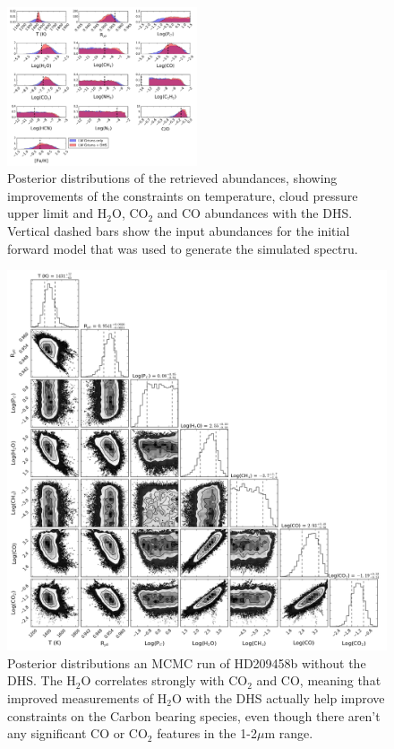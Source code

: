 \documentclass[iop]{emulateapj}
\begin{document}
\begin{figure}
\centering
\includegraphics[width=0.5\textwidth]{HD209458b_solar_clear_DHS.pdf}
\caption{Posterior distributions of the retrieved abundances, showing improvements of the constraints on temperature, cloud pressure upper limit and H$_2$O, CO$_2$ and CO abundances with the DHS.
Vertical dashed bars show the input abundances for the initial forward model that was used to generate the simulated spectru.}\label{fig:DHSposterios}
\end{figure}


\begin{figure}
\centering
\includegraphics[width=1.0\textwidth]{HD209458b_solar_clear_1trans_nc_only_subset.png}
\caption{Posterior distributions an MCMC run of HD209458b without the DHS.
The H$_2$O correlates strongly with CO$_2$ and CO, meaning that improved measurements of H$_2$O with the DHS actually help improve constraints on the Carbon bearing species, even though there aren't any significant CO or CO$_2$ features in the 1-2$\mu$m range.}\label{fig:cornerRun}
\end{figure}
\end{document}
